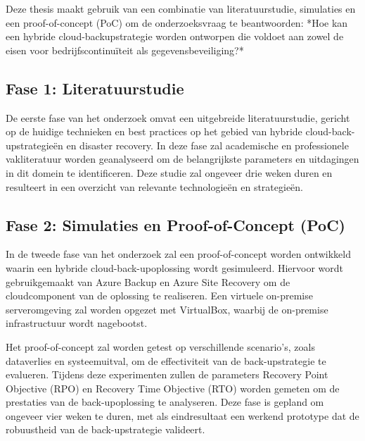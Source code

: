 


Deze thesis maakt gebruik van een combinatie van literatuurstudie, simulaties en een proof-of-concept (PoC) om de onderzoeksvraag te beantwoorden: *Hoe kan een hybride cloud-backupstrategie worden ontworpen die voldoet aan zowel de eisen voor bedrijfscontinuïteit als gegevensbeveiliging?*

\subsection{Fase 1: Literatuurstudie}
De eerste fase van het onderzoek omvat een uitgebreide literatuurstudie, gericht op de huidige technieken en best practices op het gebied van hybride cloud-back-upstrategieën en disaster recovery. In deze fase zal academische en professionele vakliteratuur worden geanalyseerd om de belangrijkste parameters en uitdagingen in dit domein te identificeren. Deze studie zal ongeveer drie weken duren en resulteert in een overzicht van relevante technologieën en strategieën.

\subsection{Fase 2: Simulaties en Proof-of-Concept (PoC)}
In de tweede fase van het onderzoek zal een proof-of-concept worden ontwikkeld waarin een hybride cloud-back-upoplossing wordt gesimuleerd. Hiervoor wordt gebruikgemaakt van Azure Backup en Azure Site Recovery om de cloudcomponent van de oplossing te realiseren. Een virtuele on-premise serveromgeving zal worden opgezet met VirtualBox, waarbij de on-premise infrastructuur wordt nagebootst.

Het proof-of-concept zal worden getest op verschillende scenario's, zoals dataverlies en systeemuitval, om de effectiviteit van de back-upstrategie te evalueren. Tijdens deze experimenten zullen de parameters Recovery Point Objective (RPO) en Recovery Time Objective (RTO) worden gemeten om de prestaties van de back-upoplossing te analyseren. Deze fase is gepland om ongeveer vier weken te duren, met als eindresultaat een werkend prototype dat de robuustheid van de back-upstrategie valideert.

